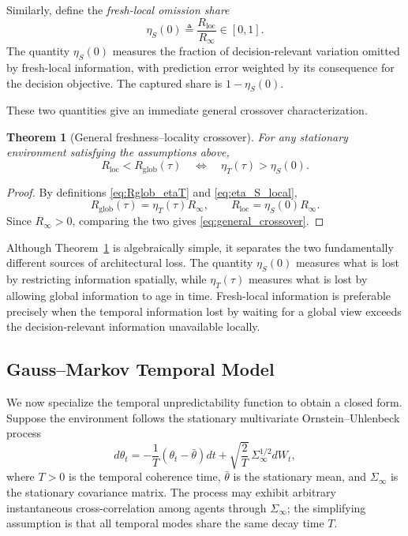 \documentclass[11pt]{article}
\newtheorem{theorem}{Theorem}
\begin{document}
Similarly, define the \emph{fresh-local omission share}
\begin{equation}
    \eta_S(0)
    \triangleq
    \frac{R_{\mathrm{loc}}}{R_\infty}
    \in[0,1].
    \label{eq:eta_S_local}
\end{equation}
The quantity $\eta_S(0)$ measures the fraction of decision-relevant variation
omitted by fresh-local information, with prediction error weighted by its
consequence for the decision objective. The captured share is $1-\eta_S(0)$.

These two quantities give an immediate general crossover characterization.

\begin{theorem}[General freshness--locality crossover]
\label{thm:general_crossover}
For any stationary environment satisfying the assumptions above,
\begin{equation}
    R_{\mathrm{loc}}
    <
    R_{\mathrm{glob}}(\tau)
    \quad\Longleftrightarrow\quad
    \eta_T(\tau)
    >
    \eta_S(0).
    \label{eq:general_crossover}
\end{equation}
\end{theorem}

\begin{proof}
By definitions \eqref{eq:Rglob_etaT} and \eqref{eq:eta_S_local},
\[
    R_{\mathrm{glob}}(\tau)
    =
    \eta_T(\tau)R_\infty,
    \qquad
    R_{\mathrm{loc}}
    =
    \eta_S(0)R_\infty.
\]
Since $R_\infty>0$, comparing the two gives
\eqref{eq:general_crossover}.
\end{proof}

Although Theorem~\ref{thm:general_crossover} is algebraically simple, it
separates the two fundamentally different sources of architectural loss.
The quantity $\eta_S(0)$ measures what is lost by restricting
information spatially, while $\eta_T(\tau)$ measures what is lost by allowing
global information to age in time. Fresh-local information is preferable
precisely when the temporal information lost by waiting for a global view
exceeds the decision-relevant information unavailable locally.

\subsection{Gauss--Markov Temporal Model}
\label{subsec:OU_model}

We now specialize the temporal unpredictability function to obtain a closed
form. Suppose the environment follows the stationary multivariate
Ornstein--Uhlenbeck process
\begin{equation}
    d\theta_t
    =
    -\frac{1}{T}
    \left(
        \theta_t-\bar{\theta}
    \right)dt
    +
    \sqrt{\frac{2}{T}}\,
    \Sigma_\infty^{1/2}dW_t,
    \label{eq:OU_process}
\end{equation}
where $T>0$ is the temporal coherence time,
$\bar{\theta}$ is the stationary mean, and $\Sigma_\infty$ is the stationary
covariance matrix. The process may exhibit arbitrary instantaneous
cross-correlation among agents through $\Sigma_\infty$; the simplifying
assumption is that all temporal modes share the same decay time $T$.
\end{document}
